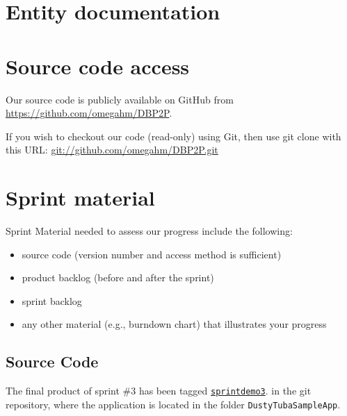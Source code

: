 \documentclass[a4paper,11pt]{article}
\begin{document}
\section{Entity documentation}


\section{Source code access}
Our source code is publicly available on GitHub from \url{https://github.com/omegahm/DBP2P}.



If you wish to checkout our code (read-only) using Git, then use git clone with this URL:
\url{git://github.com/omegahm/DBP2P.git}


\section{Sprint material}
Sprint Material needed to assess our progress include the following:
\begin{itemize}
\item source code (version number and access method is sufficient)
\item product backlog (before and after the sprint)
\item sprint backlog
\item any other material (e.g., burndown chart) that illustrates your progress
\end{itemize}


\subsection{Source Code}

The final product of sprint \#3 has been tagged \href{https://github.com/omegahm/DBP2P/tree/sprintdemo2}{\tt sprintdemo3}. in the git repository, where the application is located in the folder {\tt DustyTubaSampleApp}.
\end{document}
